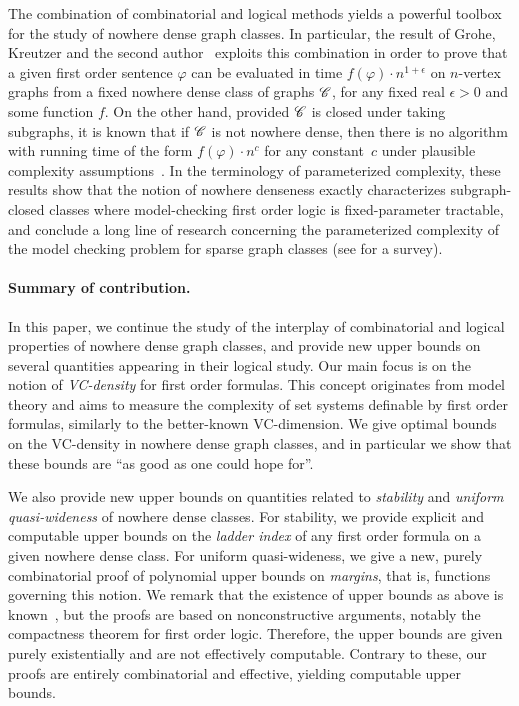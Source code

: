 The combination of combinatorial and logical methods yields a powerful toolbox for the study
of nowhere dense graph classes. In particular, 
the result of Grohe, Kreutzer and the second author~\cite{grohe2014deciding} exploits 
this combination in order to prove that  a given
first order sentence $\varphi$ can be evaluated in time 
$f(\varphi)\cdot n^{1+\epsilon}$ on $n$-vertex graphs from a fixed nowhere dense class of graphs $\mathscr{C}$, for any fixed real $\epsilon>0$ and some function $f$.
On the other hand, provided $\mathscr{C}$ is closed under taking subgraphs, it is known that if $\mathscr{C}$ is not nowhere dense,
then there is no algorithm with running time of the form $f(\varphi)\cdot n^c$ for any constant~$c$ under plausible complexity assumptions~\cite{dvovrak2013testing}.
In the terminology of parameterized complexity, these results show that the notion of nowhere denseness exactly characterizes subgraph-closed classes where model-checking first order logic
is fixed-parameter tractable, and conclude a long line of research concerning the parameterized complexity of the model checking problem for sparse graph classes (see \cite{grokre11} for a survey).

\paragraph{Summary of contribution.} In this paper, we continue the study of the 
interplay of combinatorial and logical properties
of nowhere dense graph classes, and provide
new upper bounds on several
quantities appearing in their logical study.
Our main focus is on the notion of \emph{VC-density} for first order formulas. This concept originates from model theory and 
aims to measure the complexity of set systems definable by first order formulas, similarly to the better-known VC-dimension.
We give optimal bounds on the VC-density in nowhere dense graph classes, and in particular we show that these bounds are ``as good as one could hope for''.

We also provide new upper bounds on quantities related to {\em{stability}} and {\em{uniform quasi-wideness}} of nowhere dense classes.
For stability, we provide explicit and computable upper bounds on the \emph{ladder index} of any first order formula on a given nowhere dense class.
For uniform quasi-wideness, we give a new, purely combinatorial proof of polynomial upper bounds on {\em{margins}}, that is, functions governing this notion.
We remark that the existence of upper bounds as above is known~\cite{adler2014interpreting,siebertz2016polynomial}, but the proofs are based on nonconstructive arguments, 
notably the compactness theorem for first order logic. Therefore, the upper bounds are given purely existentially and are not effectively computable.
Contrary to these, our proofs are entirely combinatorial and effective, yielding computable upper bounds.

